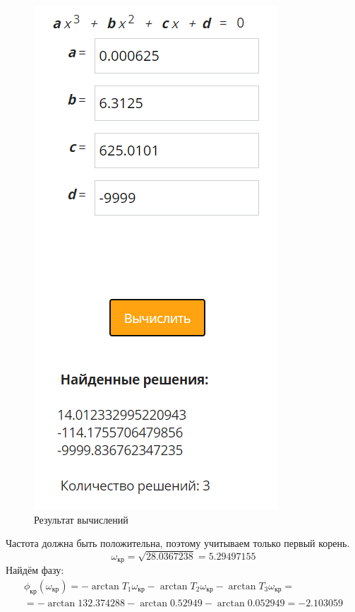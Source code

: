 \documentclass[12pt]{article}
\begin{document}
\begin{figure}[h!]
     \centering
    \includegraphics[scale=1]{аналитически.png}
    \caption{Результат вычислений}
\end{figure} 
\newpage
Частота должна быть положительна, поэтому учитываем только первый корень. 
\begin{equation}
    \omega_{кр} = \sqrt{28.0367238} = 5.29497155
\end{equation}
Найдём фазу: 
\begin{equation}
\begin{gathered}
    \phi_{кр}(\omega_{кр}) = -\arctan{T_1\omega_{кр}} -\arctan{T_2\omega_{кр}} -\arctan{T_3\omega_{кр}} = \\
    = -\arctan{132.374288} -\arctan{0.52949} - \arctan{0.052949} = -2.103059
\end{gathered}
\end{equation}
\end{document}
